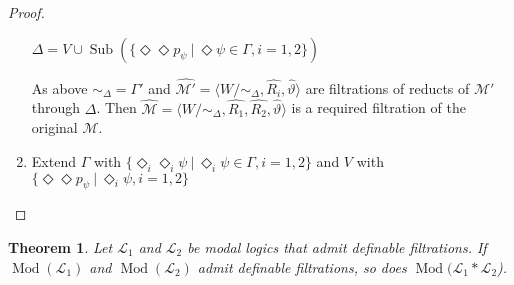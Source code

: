 \documentclass[a4paper]{article}
\theoremstyle{defin}
\theoremstyle{theorem}
\newtheorem{theorem}{Theorem}
\theoremstyle{prop}
\theoremstyle{lemma}
\theoremstyle{fact}
\theoremstyle{ex}
\theoremstyle{col}
\theoremstyle{claim}
\begin{document}
\begin{proof}
\begin{enumerate}
\begin{center}
    $\Delta = V \cup \operatorname{Sub}(\{ \Diamond \Diamond p_{\psi} \: | \: \Diamond \psi \in \Gamma, i = 1,2 \})$
  \end{center}
  As above $\sim_{\Delta} = \Gamma'$ and $\widehat{\mathcal{M}'} = \langle W /\sim_{\Delta}, \widehat{R_i}, \widehat{\vartheta} \rangle$ are filtrations of reducts of $\mathcal{M}'$ through $\Delta$. Then $\widehat{\mathcal{M}} = \langle W /\sim_{\Delta}, \widehat{R_1}, \widehat{R_2}, \widehat{\vartheta} \rangle$ is a required filtration of the original $\mathcal{M}$.
  \item Extend $\Gamma$ with $\{ \Diamond_i \Diamond_i \psi \: | \: \Diamond_i \psi \in \Gamma, i = 1,2 \}$ and
  $V$ with $\{\Diamond \Diamond p_{\psi} \: | \: \Diamond_i {\psi}, i = 1, 2\}$
  \end{enumerate}
\end{proof}

\begin{theorem}
  Let $\mathcal{L}_1$ and $\mathcal{L}_2$ be modal logics that admit definable filtrations. If $\operatorname{Mod}(\mathcal{L}_1)$ and $\operatorname{Mod}(\mathcal{L}_2)$ admit definable filtrations, so does $\operatorname{Mod}(\mathcal{L}_1 * \mathcal{L}_2$).
\end{theorem}
\end{document}
